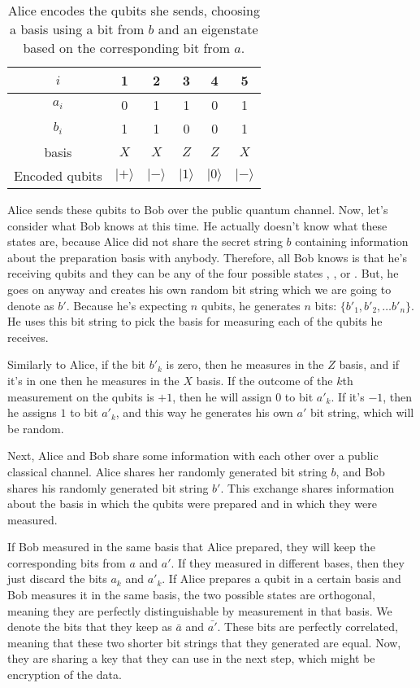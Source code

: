 \begin{table}
\centering
\begin{tabular}{|c||c|c|c|c|c|}
\hline $i$ & 1 & 2 & 3 & 4 & 5 \\
\hline $a_i$ & 0 & 1 & 1 & 0 & 1 \\
 $b_i$ & 1 & 1 & 0 & 0 & 1 \\
basis & $X$ & $X$ & $Z$ & $Z$ & $X$ \\
Encoded qubits & $|+\rangle$ & $|-\rangle$ & $|1\rangle$ & $|0\rangle$ & $|-\rangle$ \\
\hline
\end{tabular}
\caption[BB84 encoding example]{Alice encodes the qubits she sends, choosing a basis using a bit from $b$ and an eigenstate based on the corresponding bit from $a$.}
\label{tab:bb84-example}
\end{table}

Alice sends these qubits to Bob over the public quantum channel. Now, let's consider what Bob knows at this time. He actually doesn't know what these states are, because Alice did not share the secret string $b$ containing information about the preparation basis with anybody. Therefore, all Bob knows is that he's receiving qubits and they can be any of the four possible states , , \ket{+} or \ket{-}. But, he goes on anyway and creates his own random bit string which we are going to denote as $b'$. Because he's expecting $n$ qubits, he generates $n$ bits: $\{b'_1, b'_2, \ldots b'_n\}$.  He uses this bit string to pick the basis for measuring each of the qubits he receives.

Similarly to Alice, if the bit $b'_k$ is zero, then he measures in the $Z$ basis, and if it's in one then he measures in the $X$ basis. If the outcome of the $k$th measurement on the qubits is $+1$, then he will assign $0$ to bit $a'_k$. If it's $-1$, then he assigns $1$ to bit $a'_k$, and this way he generates his own $a'$ bit string, which will be random.

Next, Alice and Bob share some information with each other over a public classical channel. Alice shares her randomly generated bit string $b$, and Bob shares his randomly generated bit string $b'$.  This exchange shares information about the basis in which the qubits were prepared and in which they were measured.

If Bob measured in the same basis that Alice prepared, they will keep the corresponding bits from $a$ and $a'$. If they measured in different bases, then they just discard the bits $a_k$ and $a'_k$. If Alice prepares a qubit in a certain basis and Bob measures it in the same basis, the two possible states are orthogonal, meaning they are perfectly distinguishable by measurement in that basis.
We denote the bits that they keep as $\bar{a}$ and $\bar{a'}$. These bits are perfectly correlated, meaning that these two shorter bit strings that they generated are equal. Now, they are sharing a key that they can use in the next step, which might be encryption of the data.

